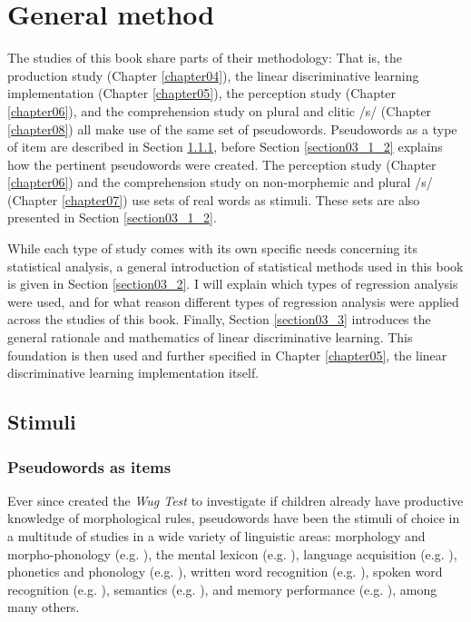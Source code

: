 \chapter{General method}\label{chapter03}

The studies of this book share parts of their methodology: That is, the production study (Chapter \ref{chapter04}), the linear discriminative learning implementation (Chapter \ref{chapter05}), the perception study (Chapter \ref{chapter06}), and the comprehension study on plural and clitic /s/ (Chapter \ref{chapter08}) all make use of the same set of pseudowords. Pseudowords as a type of item are described in Section \ref{section03_1_1}, before Section \ref{section03_1_2} explains how the pertinent pseudowords were created. The perception study (Chapter \ref{chapter06}) and the comprehension study on non-morphemic and plural /s/ (Chapter \ref{chapter07}) use sets of real words as stimuli. These sets are also presented in Section \ref{section03_1_2}.

While each type of study comes with its own specific needs concerning its statistical analysis, a general introduction of statistical methods used in this book is given in Section \ref{section03_2}. I will explain which types of regression analysis were used, and for what reason different types of regression analysis were applied across the studies of this book.
Finally, Section \ref{section03_3} introduces the general rationale and mathematics of linear discriminative learning. This foundation is then used and further specified in Chapter \ref{chapter05}, the linear discriminative learning implementation itself.

\section{Stimuli}\label{section03_1}

\subsection{Pseudowords as items}\label{section03_1_1}

Ever since \citet{Berko1958} created the \textit{Wug Test} to investigate if children already have productive knowledge of morphological rules, pseudowords have been the stimuli of choice in a multitude of studies in a wide variety of linguistic areas: morphology and morpho-phonology (e.g. \cite{Albright2002, Albright2003, Pierrehumbert2006, Dabrowska2008, Kraemer2009, Kawahara2012, Gouskova2013}), the mental lexicon (e.g. \cite{Rubenstein1970, Anshen1988, Prasada1993, Vitevitch1998, Eddington2000, Shatzman2006pseudo, Meunier2007}), language acquisition (e.g. \cite{Dollaghan1985, Singson2000, Friedrich2005, Vijver2014}), phonetics and phonology (e.g. \cite{Turcsan2015, Schmitz2018}), written word recognition (e.g. \cite{Burani1999, McKay2008}), spoken word recognition (e.g. \cite{Marslen1984}), semantics (e.g. \cite{Ozubko2011}), and memory performance (e.g. \cite{Hulme1995}), among many others.

